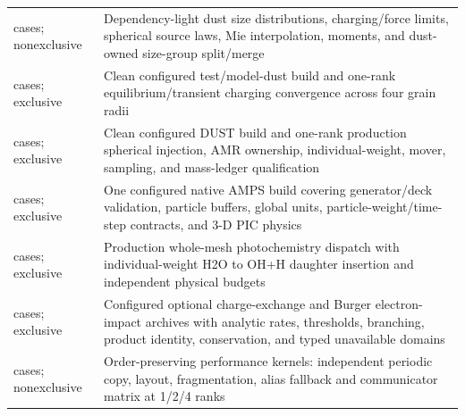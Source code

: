 \begin{longtable}{L{0.38\textwidth}L{0.51\textwidth}}
 cases; nonexclusive & Dependency-light dust size distributions, charging/force limits, spherical source laws, Mie interpolation, moments, and dust-owned size-group split/merge\newline{}\\
 cases; exclusive & Clean configured test/model-dust build and one-rank equilibrium/transient charging convergence across four grain radii\newline{}\\
 cases; exclusive & Clean configured DUST build and one-rank production spherical injection, AMR ownership, individual-weight, mover, sampling, and mass-ledger qualification\newline{}\\
 cases; exclusive & One configured native AMPS build covering generator/deck validation, particle buffers, global units, particle-weight/time-step contracts, and 3-D PIC physics\newline{}\\
 cases; exclusive & Production whole-mesh photochemistry dispatch with individual-weight H2O to OH+H daughter insertion and independent physical budgets\newline{}\\
 cases; exclusive & Configured optional charge-exchange and Burger electron-impact archives with analytic rates, thresholds, branching, product identity, conservation, and typed unavailable domains\newline{}\\
 cases; nonexclusive & Order-preserving performance kernels: independent periodic copy, layout, fragmentation, alias fallback and communicator matrix at 1/2/4 ranks\newline{}\\

\end{longtable}

